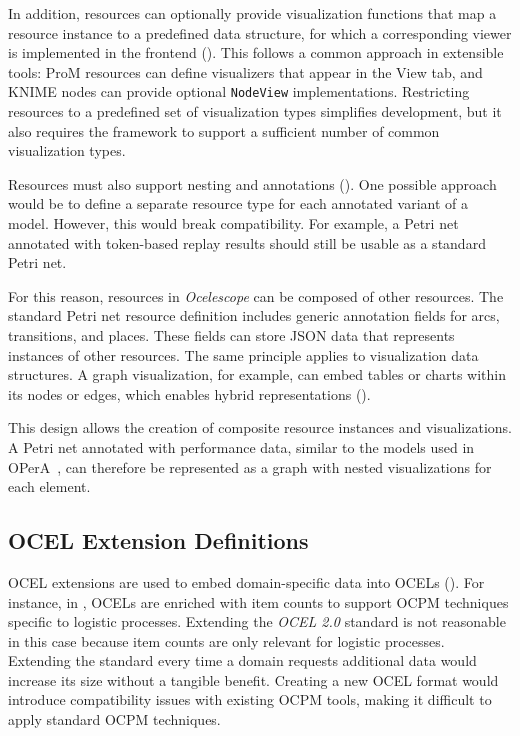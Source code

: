 In addition, resources can optionally provide visualization functions that map a resource instance to a predefined data structure, for which a corresponding viewer is implemented in the frontend ().
This follows a common approach in extensible tools: ProM resources can define visualizers that appear in the View tab, and KNIME nodes can provide optional \texttt{NodeView} implementations.
Restricting resources to a predefined set of visualization types simplifies development, but it also requires the framework to support a sufficient number of common visualization types.

Resources must also support nesting and annotations ().
One possible approach would be to define a separate resource type for each annotated variant of a model. However, this would break compatibility.
For example, a Petri net annotated with token-based replay results should still be usable as a standard Petri net.

For this reason, resources in \textit{Ocelescope} can be composed of other resources. The standard Petri net resource definition includes generic annotation fields for arcs, transitions, and places. These fields can store JSON data that represents instances of other resources. The same principle applies to visualization data structures. A graph visualization, for example, can embed tables or charts within its nodes or edges, which enables hybrid representations ().

This design allows the creation of composite resource instances and visualizations. A Petri net annotated with performance data, similar to the models used in OPerA~\cite{opera}, can therefore be represented as a graph with nested visualizations for each element.

\subsection{OCEL Extension Definitions}

OCEL extensions are used to embed domain-specific data into OCELs ().
For instance, in \cite{qrpm}, OCELs are enriched with item counts to support OCPM techniques specific to logistic processes.
Extending the \textit{OCEL 2.0} standard is not reasonable in this case because item counts are only relevant for logistic processes.
Extending the standard every time a domain requests additional data would increase its size without a tangible benefit.
Creating a new OCEL format would introduce compatibility issues with existing OCPM tools, making it difficult to apply standard OCPM techniques.

